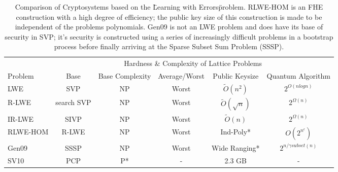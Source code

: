 
\begin{table}
\begin{tabular}{l c c c c c} 
& \multicolumn{5}{c}{Hardness \& Complexity of Lattice Problems} \\
\cmidrule(l){2-6} 
Problem & Base & Base Complexity & Average/Worst & Public Keysize & Quantum Algorithm\\ 
\midrule 
LWE & SVP & NP & Worst & $\tilde{O}(n^{2})$ & $2^{O(nlogn)}$\\ %
R-LWE & search SVP & NP & Worst & $\tilde{O}(\sqrt{n})$ & $2^{\Omega(n)}$\\ %
IR-LWE & SIVP & NP & Worst &  $ {\tilde {O}}(n) $  & $2^{\Omega(n)}$\\ %
RLWE-HOM & R-LWE & NP & Worst & Ind-Poly* & $O(2^{n^{\epsilon}})$\\ %
Gen09 & SSSP & NP & Worst & Wide Ranging* & $2^{n/\gamma subset(n)}$\\ %
SV10 & PCP & P* & - & 2.3 GB & -\\ %
\midrule %
\end{tabular}
\caption{Comparison of Cryptosystems based on the \"Learning with Errors\" problem. RLWE-HOM is an FHE construction with a high degree of efficiency; the public key size of this construction is made to be independent of the problems polynomials. Gen09 is not an LWE problem and does have its base of security in SVP; it's security is constructed using a series of increasingly difficult problems in a bootstrap process before finally arriving at the Sparse Subset Sum Problem (SSSP).} %
\end{table}



